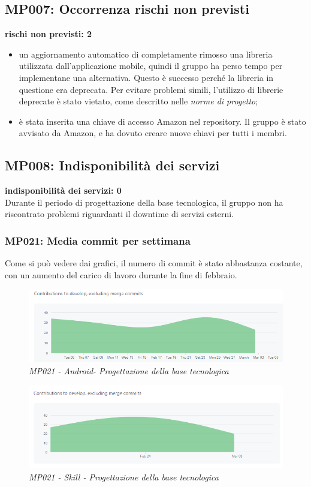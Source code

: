 \subsection{MP007:  Occorrenza rischi non previsti}
\textbf{rischi non previsti: 2}
\begin{itemize}
	\item un aggiornamento automatico di  completamente rimosso una libreria utilizzata dall'applicazione mobile, quindi il gruppo ha perso tempo per implementane una alternativa. Questo è successo perché la libreria in questione era deprecata. Per evitare problemi simili, l'utilizzo di librerie deprecate è stato vietato, come descritto nelle \textit{norme di progetto};
	\item è stata inserita una chiave di accesso Amazon nel repository. Il gruppo è stato avvisato da Amazon, e ha dovuto creare nuove chiavi per tutti i membri.
\end{itemize}
\subsection{MP008: Indisponibilità dei servizi}
\textbf{indisponibilità dei servizi: 0}\\
Durante il periodo di progettazione della base tecnologica, il gruppo non ha riscontrato problemi riguardanti il downtime di servizi esterni.

\subsubsection{MP021: Media commit per settimana}
Come si può vedere dai grafici, il numero di commit è stato abbastanza costante, con un aumento del carico di lavoro durante la fine di febbraio.
\begin{figure} [h]
    \centering
	\includegraphics[scale=0.5]{./images/dailycommits_kotlin.PNG}
    \caption{\textit{MP021 - Android- Progettazione della base tecnologica}}\label{}
\end{figure}
\begin{figure} [h]
    \centering
	\includegraphics[scale=0.5]{./images/daycommits_js.PNG}
    \caption{\textit{MP021 - Skill - Progettazione della base tecnologica}}\label{}
\end{figure}

